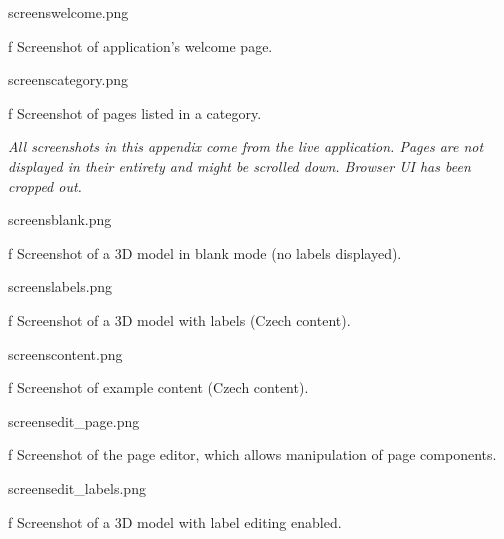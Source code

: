 \midinsert
\picw=15cm  \cinspic screens\/welcome.png
\caption/f Screenshot of application’s welcome page.
\endinsert

\midinsert
\picw=15cm  \cinspic screens\/category.png
\caption/f Screenshot of pages listed in a category.
\endinsert

{\it All screenshots in this appendix come from the live application. Pages are not displayed in their entirety and might be scrolled down. Browser UI has been cropped out.}

\midinsert
\picw=15cm  \cinspic screens\/blank.png
\caption/f Screenshot of a 3D model in blank mode (no labels displayed).
\endinsert

\midinsert
\picw=15cm  \cinspic screens\/labels.png
\caption/f Screenshot of a 3D model with labels (Czech content).
\endinsert

\midinsert
\picw=15cm  \cinspic screens\/content.png
\caption/f Screenshot of example content (Czech content).
\endinsert

\midinsert
\picw=15cm  \cinspic screens\/edit_page.png
\caption/f Screenshot of the page editor, which allows manipulation of page components.
\endinsert

\midinsert
\picw=15cm  \cinspic screens\/edit_labels.png
\caption/f Screenshot of a 3D model with label editing enabled.
\endinsert